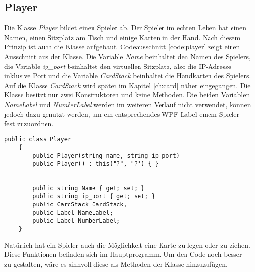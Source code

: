 \subsection{Player}
Die Klasse \textit{Player} bildet einen Spieler ab. Der Spieler im echten Leben hat einen Namen, einen Sitzplatz am Tisch und einige Karten in der Hand. Nach diesem Prinzip ist auch die Klasse aufgebaut. Codeausschnitt \ref{code:player} zeigt einen Ausschnitt aus der Klasse. Die Variable \textit{Name} beinhaltet den Namen des Spielers, die Variable \textit{ip\_port} beinhaltet den virtuellen Sitzplatz, also die IP-Adresse inklusive Port und die Variable \textit{CardStack} beinhaltet die Handkarten des Spielers. Auf die Klasse \textit{CardStack} wird später im Kapitel \ref{ch:card} näher eingegangen. Die Klasse besitzt nur zwei Konstruktoren und keine Methoden. Die beiden Variablen \textit{NameLabel} und \textit{NumberLabel} werden im weiteren Verlauf nicht verwendet, können jedoch dazu genutzt werden, um ein entsprechendes WPF-Label einem Spieler fest zuzuordnen.
\begin{lstlisting}[label=code:player, caption={Codeauschnitt Klasse \textit{Player}}]
 	public class Player
	{
		public Player(string name, string ip_port)
		public Player() : this("?", "?") { }
		
		
		public string Name { get; set; }
		public string ip_port { get; set; }
		public CardStack CardStack;
		public Label NameLabel;
		public Label NumberLabel;
	}
\end{lstlisting}
Natürlich hat ein Spieler auch die Möglichkeit eine Karte zu legen oder zu ziehen. Diese Funktionen befinden sich im Hauptprogramm. Um den Code noch besser zu gestalten, wäre es sinnvoll diese als Methoden der Klasse hinzuzufügen.

